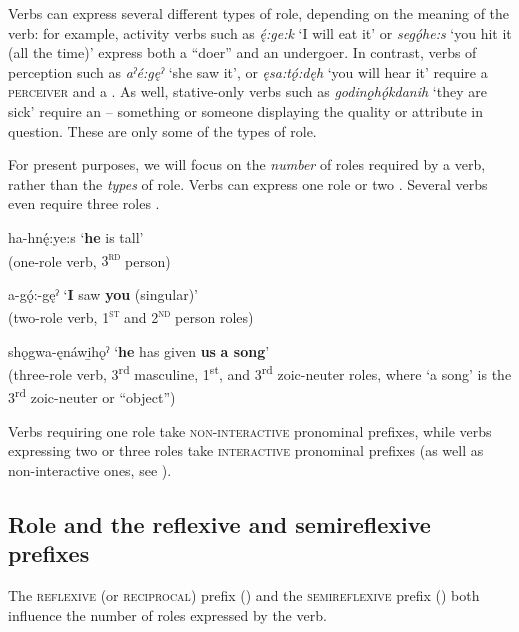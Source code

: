 Verbs can express several different types of role, depending on the meaning of the verb: for example, activity verbs such as \textit{ę́:ge:k} ‘I will eat it’ or \textit{segǫ́he:s} ‘you hit it (all the time)’ express both a “doer” and an undergoer. In contrast,  verbs of perception such as \textit{aˀé:gęˀ} ‘she saw it’, or \textit{ęsa:tǫ́:dęh} ‘you will hear it’ require a \textsc{perceiver} and a . As well, stative-only verbs such as \textit{godinǫ̱hǫ́kdanih} ‘they are sick’ require an  -- something or someone displaying the quality or attribute in question. These are only some of the types of role.

For present purposes, we will focus on the \emph{number} of roles required by a verb, rather than the \emph{types} of role. Verbs can express one role  or two . Several verbs even require three roles .

\ea\label{ex:rolex200} ha-hnę́:ye:s ‘\textbf{he} is tall’\\
\glt  (one-role verb, \textsc{3\textsuperscript{rd}} person)
\z

\ea\label{ex:rolex300} a-gǫ́:-gęˀ ‘\textbf{I} saw \textbf{you} (singular)’\\
\glt  (two-role verb, \textsc{1\textsuperscript{st}} and \textsc{2\textsuperscript{nd}} person roles)
\z

\ea\label{ex:rolex400} shǫgwa-ęnáwi̱hǫˀ ‘\textbf{he} has given \textbf{us} \textbf{a song}’\\
\glt  (three-role verb, 3\textsuperscript{rd} masculine, 1\textsuperscript{st}, and 3\textsuperscript{rd} zoic-neuter roles, where ‘a song’ is the 3\textsuperscript{rd} zoic-neuter {\undergoer} or “object”)
\z

Verbs requiring one role take \textsc{non-interactive} pronominal prefixes, while verbs expressing two or three roles take \textsc{interactive} pronominal prefixes (as well as non-interactive ones, see ).


\subsection{Role and the reflexive and semireflexive prefixes} \label{Role and the reflexive and semireflexive prefixes}
The \textsc{reflexive} (or \textsc{reciprocal}) prefix () and the \textsc{semireflexive} prefix () both influence the number of roles expressed by the verb. 

